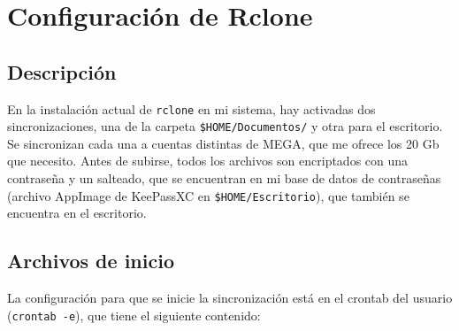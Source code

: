 



    \section{Configuración de Rclone}
    \subsection{Descripción}
    En la instalación actual de \texttt{rclone} en mi sistema, hay activadas dos sincronizaciones, una de la carpeta \texttt{\$HOME/Documentos/} y otra para el escritorio. Se sincronizan cada una a cuentas distintas de MEGA, que me ofrece los 20 Gb que necesito. Antes de subirse, todos los archivos son encriptados con una contraseña y un salteado, que se encuentran en mi base de datos de contraseñas (archivo AppImage de KeePassXC en \texttt{\$HOME/Escritorio}), que también se encuentra en el escritorio.

    \subsection{Archivos de inicio}
    La configuración para que se inicie la sincronización está en el crontab del usuario (\texttt{crontab -e}),
    que tiene el siguiente contenido:
    
